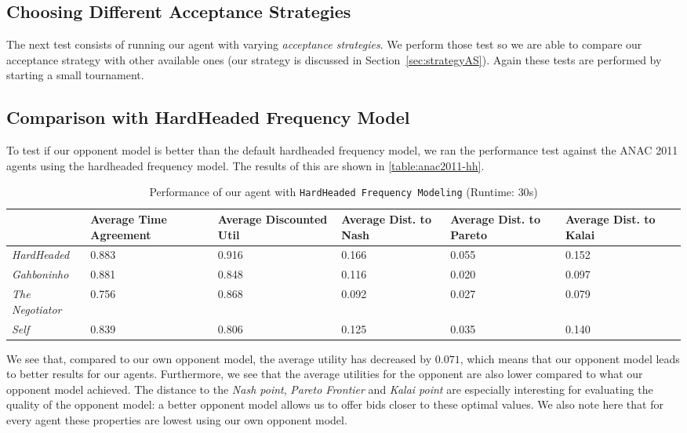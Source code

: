 
\subsection{Choosing Different Acceptance Strategies}

The next test consists of running our agent with varying \emph{acceptance strategies}. We perform those test so we are able to compare our acceptance strategy with other available ones (our strategy is discussed in Section~\ref{sec:strategyAS}). Again these tests are performed by starting a small tournament. \\


\subsection{Comparison with HardHeaded Frequency Model}
To test if our opponent model is better than the default hardheaded frequency model, we ran the performance test against the ANAC 2011 agents using the hardheaded frequency model. The results of this are shown in \autoref{table:anac2011-hh}.
\begin{table}[H]
	\centering
	\small
    \begin{tabular}{l|p{2cm}|p{2cm}|p{2cm}|p{2cm}|p{2cm}|p{2cm}|}
    ~              & Average Time Agreement & Average Discounted Util & Average Dist. to Nash & Average Dist. to Pareto & Average Dist. to Kalai \\
    \hline
    \emph{HardHeaded}		& 0.883  & 0.916  & 0.166  & 0.055  & 0.152   \\ \hline
    \emph{Gahboninho}   	& 0.881  & 0.848  & 0.116  & 0.020  & 0.097   \\ \hline
    \emph{The Negotiator} 	& 0.756  & 0.868  & 0.092  & 0.027  & 0.079   \\ \hline
    \emph{Self}             & 0.839  & 0.806  & 0.125  & 0.035  & 0.140   \\ \hline
    \end{tabular}
    \caption{Performance of our agent with \texttt{HardHeaded Frequency Modeling} (Runtime: $30$s) \label{table:anac2011-hh}}
\end{table}
We see that, compared to our own opponent model, the average utility has decreased by $0.071$, which means that our opponent model leads to  better results for our agents. 
Furthermore, we see that the average utilities for the opponent are also lower compared to what our opponent model achieved.
The distance to the \emph{Nash point}, \emph{Pareto Frontier} and \emph{Kalai point} are especially interesting for evaluating the quality of the opponent model: a better opponent model allows us to offer bids closer to these optimal values. We also note here that for every agent these properties are lowest using our own opponent model.

